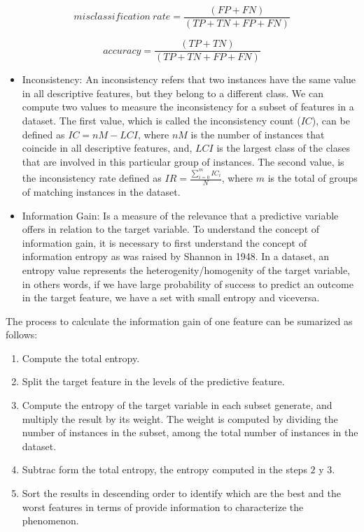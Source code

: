 \documentclass[]{book}
\providecommand{\tightlist}{%
  \setlength{\itemsep}{0pt}\setlength{\parskip}{0pt}}
\begin{document}
\begin{equation}
  misclassification\ rate=\frac{(FP+FN)}{(TP+TN+FP+FN)}
  \label{eq:math-misclassification-rate}
\end{equation}

\begin{equation}
  accuracy=\frac{(TP+TN)}{(TP+TN+FP+FN)}
  \label{eq:math-accuracy}
\end{equation}

\begin{itemize}
\item
  Inconsistency: An inconsistency refers that two instances have the
  same value in all descriptive features, but they belong to a different
  class. We can compute two values to measure the inconsistency for a
  subset of features in a dataset. The first value, which is called the
  inconsistency count (\(IC\)), can be defined as \(IC=nM-LCI\), where
  \(nM\) is the number of instances that coincide in all descriptive
  features, and, \(LCI\) is the largest class of the clases that are
  involved in this particular group of instances. The second value, is
  the inconsistency rate defined as \(IR=\frac{\sum_{i=0}^{m}IC_i}{N}\),
  where \(m\) is the total of groups of matching instances in the
  dataset.
\item
  Information Gain: Is a measure of the relevance that a predictive
  variable offers in relation to the target variable. To understand the
  concept of information gain, it is necessary to first understand the
  concept of information entropy as was raised by Shannon in 1948. In a
  dataset, an entropy value represents the heterogenity/homogenity of
  the target variable, in others words, if we have large probability of
  success to predict an outcome in the target feature, we have a set
  with small entropy and viceversa.
\end{itemize}

The process to calculate the information gain of one feature can be
sumarized as follows:

\begin{enumerate}
\def\labelenumi{\arabic{enumi}.}
\tightlist
\item
  Compute the total entropy.
\item
  Split the target feature in the levels of the predictive feature.
\item
  Compute the entropy of the target variable in each subset generate,
  and multiply the result by its weight. The weight is computed by
  dividing the number of instances in the subset, among the total number
  of instances in the dataset.
\item
  Subtrac form the total entropy, the entropy computed in the steps
  \(2\) y \(3\).
\item
  Sort the results in descending order to identify which are the best
  and the worst features in terms of provide information to characterize
  the phenomenon.
\end{enumerate}
\end{document}
